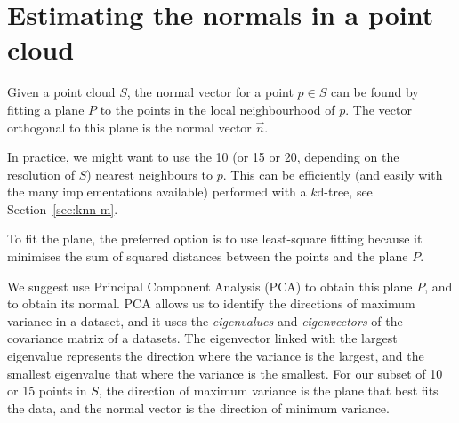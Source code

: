 
\graphicspath{{appendices/normalplane/figs/}}

\chapter{Estimating the normals in a point cloud}%
\label{app:normalplane}

Given a point cloud $S$, the normal vector for a point $p \in S$ can be found by fitting a plane $P$ to the points in the local neighbourhood of $p$. 
The vector orthogonal to this plane is the normal vector $\vec{n}$.

In practice, we might want to use the 10 (or 15 or 20, depending on the resolution of $S$) nearest neighbours to $p$.
This can be efficiently (and easily with the many implementations available) performed with a $k$d-tree, see Section~\ref{sec:knn-m}.

To fit the plane, the preferred option is to use least-square fitting because it minimises the sum of squared distances between the points and the plane $P$.

We suggest use Principal Component Analysis (PCA) to obtain this plane $P$, and to obtain its normal.
PCA allows us to identify the directions of maximum variance in a dataset, and it uses the \emph{eigenvalues} and \emph{eigenvectors} of the covariance matrix of a datasets.
The eigenvector linked with the largest eigenvalue represents the direction where the variance is the largest, and the smallest eigenvalue that where the variance is the smallest.
For our subset of 10 or 15 points in $S$, the direction of maximum variance is the plane that best fits the data, and the normal vector is the direction of minimum variance.



